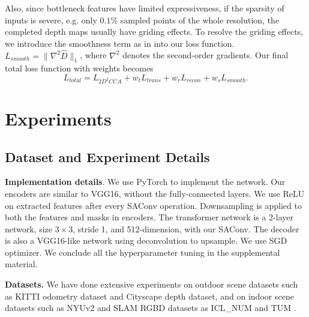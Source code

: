 \documentclass{article}
\begin{document}
Also, since bottleneck features have limited expressiveness, if the sparsity of inputs is severe, e.g. only $0.1\%$ sampled points of the whole resolution, the completed depth maps usually have griding effects. To resolve the griding effects, we introduce the smoothness term as in \cite{zhou2017unsupervised} into our loss function. $L_{smooth} = \| \nabla^2\hat{D}\| _1$, where $\nabla^2$ denotes the second-order gradients. 
Our final total loss function with weights becomes
\begin{equation}
\label{L_total}
     L_{total} = L_{2D^2CCA}+ w_t L_{trans} + w_r L_{recon} + w_s L_{smooth}.
\end{equation}

\section{Experiments}
\label{Experiments}
\subsection{Dataset and Experiment Details}
\label{Dataset and Experiment Details}

\textbf{Implementation details}. We use PyTorch to implement the network. Our encoders are similar to VGG16, without the fully-connected layers. We use ReLU on extracted features after every SAConv operation. Downsampling is applied to both the features and masks in encoders. The transformer network is a 2-layer network, size $3\times3$, stride 1, and 512-dimension, with our SAConv. The decoder is also a VGG16-like network using deconvolution to upsample. We use SGD optimizer. We conclude all the hyperparameter tuning in the supplemental material.

\textbf{Datasets.} We have done extensive experiments on outdoor scene datasets such as KITTI odometry dataset \cite{geiger2012we} and Cityscape depth dataset\cite{cordts2016cityscapes},
 and on indoor scene datasets such as NYUv2 \cite{silberman2012indoor} and SLAM RGBD datasets as ICL\_NUM \cite{handa2014benchmark} and TUM \cite{sturm2012benchmark}.
 
\end{document}
